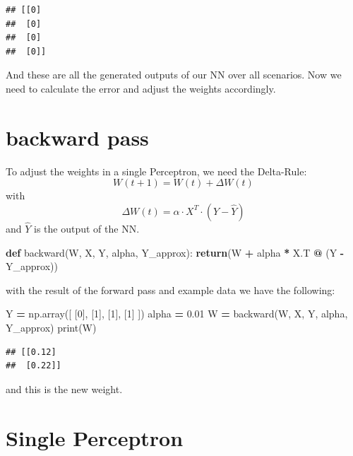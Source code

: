 \documentclass[
]{book}
\newenvironment{Shaded}{\begin{snugshade}}{\end{snugshade}}
\newcommand{\BuiltInTok}[1]{#1}
\newcommand{\ControlFlowTok}[1]{\textcolor[rgb]{0.13,0.29,0.53}{\textbf{#1}}}
\newcommand{\DecValTok}[1]{\textcolor[rgb]{0.00,0.00,0.81}{#1}}
\newcommand{\FloatTok}[1]{\textcolor[rgb]{0.00,0.00,0.81}{#1}}
\newcommand{\KeywordTok}[1]{\textcolor[rgb]{0.13,0.29,0.53}{\textbf{#1}}}
\newcommand{\NormalTok}[1]{#1}
\newcommand{\OperatorTok}[1]{\textcolor[rgb]{0.81,0.36,0.00}{\textbf{#1}}}
\begin{document}
\begin{verbatim}
## [[0]
##  [0]
##  [0]
##  [0]]
\end{verbatim}

And these are all the generated outputs of our NN over all scenarios. Now we need to calculate the error and adjust the weights accordingly.

\hypertarget{backward-pass}{%
\section{backward pass}\label{backward-pass}}

To adjust the weights in a single Perceptron, we need the Delta-Rule:
\[
  W(t+1) = W(t) + \Delta W(t)
\]
with
\[
  \Delta W(t) = \alpha \cdot X^{T} \cdot (Y - \hat{Y})
\]
and \(\hat{Y}\) is the output of the NN.

\begin{Shaded}
\begin{Highlighting}[]
\KeywordTok{def}\NormalTok{ backward(W, X, Y, alpha, Y\_approx):}
    \ControlFlowTok{return}\NormalTok{(W }\OperatorTok{+}\NormalTok{ alpha }\OperatorTok{*}\NormalTok{ X.T }\OperatorTok{@}\NormalTok{ (Y }\OperatorTok{{-}}\NormalTok{ Y\_approx))}
\end{Highlighting}
\end{Shaded}

with the result of the forward pass and example data we have the following:

\begin{Shaded}
\begin{Highlighting}[]
\NormalTok{Y }\OperatorTok{=}\NormalTok{ np.array([}
\NormalTok{  [}\DecValTok{0}\NormalTok{],}
\NormalTok{  [}\DecValTok{1}\NormalTok{],}
\NormalTok{  [}\DecValTok{1}\NormalTok{],}
\NormalTok{  [}\DecValTok{1}\NormalTok{]}
\NormalTok{])}
\NormalTok{alpha }\OperatorTok{=} \FloatTok{0.01}
\NormalTok{W }\OperatorTok{=}\NormalTok{ backward(W, X, Y, alpha, Y\_approx)}
\BuiltInTok{print}\NormalTok{(W)}
\end{Highlighting}
\end{Shaded}

\begin{verbatim}
## [[0.12]
##  [0.22]]
\end{verbatim}

and this is the new weight.

\hypertarget{single-perceptron-1}{%
\section{Single Perceptron}\label{single-perceptron-1}}
\end{document}
